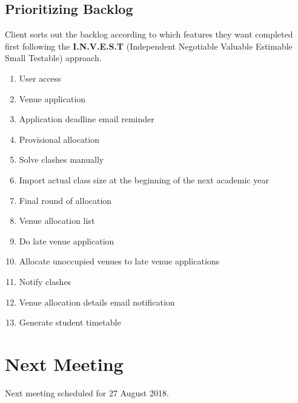 \documentclass[11pt]{article}
\begin{document}
\subsection{Prioritizing Backlog}
Client sorts out the backlog according to which features they want completed first following the \textbf{I.N.V.E.S.T} (Independent Negotiable Valuable Estimable Small Testable) approach.\\
\begin{enumerate}
	\item User access
	\item Venue application 
	\item Application deadline email reminder
	\item Provisional allocation
	\item Solve clashes manually
	\item Import actual class size at the beginning of the next academic year
	\item Final round of allocation
	\item Venue allocation list
	\item Do late venue application
	\item Allocate unoccupied venues to late venue applications
	\item Notify clashes
	\item Venue allocation details email notification
	\item Generate student timetable
\end{enumerate}

\section{Next Meeting}
Next meeting scheduled for 27 August 2018.
\end{document}
